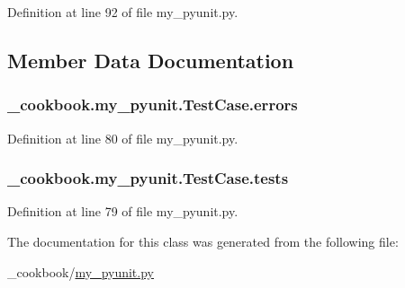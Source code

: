 Definition at line 92 of file my\-\_\-pyunit.\-py.



\subsection{Member Data Documentation}
\hypertarget{class__cookbook_1_1my__pyunit_1_1TestCase_a6bef30a7e15e97ea3e0516dd58517dd7}{
\subsubsection[{errors}]{\setlength{\rightskip}{0pt plus 5cm}\-\_\-cookbook.\-my\-\_\-pyunit.\-Test\-Case.\-errors}}\label{class__cookbook_1_1my__pyunit_1_1TestCase_a6bef30a7e15e97ea3e0516dd58517dd7}


Definition at line 80 of file my\-\_\-pyunit.\-py.

\hypertarget{class__cookbook_1_1my__pyunit_1_1TestCase_a5fa4c4edcd81210291d7afa3c82321e3}{
\subsubsection[{tests}]{\setlength{\rightskip}{0pt plus 5cm}\-\_\-cookbook.\-my\-\_\-pyunit.\-Test\-Case.\-tests}}\label{class__cookbook_1_1my__pyunit_1_1TestCase_a5fa4c4edcd81210291d7afa3c82321e3}


Definition at line 79 of file my\-\_\-pyunit.\-py.



The documentation for this class was generated from the following file\-:\begin{DoxyCompactItemize}
\item 
\-\_\-cookbook/\hyperlink{my__pyunit_8py}{my\-\_\-pyunit.\-py}\end{DoxyCompactItemize}
